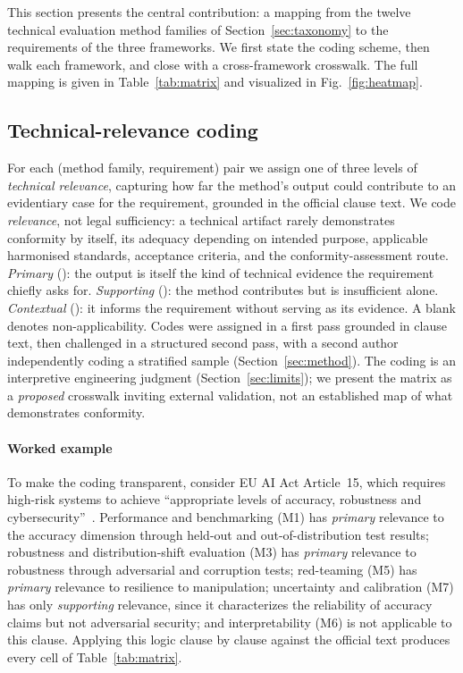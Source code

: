 This section presents the central contribution: a mapping from the twelve technical
evaluation method families of Section~\ref{sec:taxonomy} to the requirements of the three
frameworks. We first state the coding scheme, then walk each framework, and close with a
cross-framework crosswalk. The full mapping is given in Table~\ref{tab:matrix} and
visualized in Fig.~\ref{fig:heatmap}.

\subsection{Technical-relevance coding}
For each (method family, requirement) pair we assign one of three levels of \emph{technical
relevance}, capturing how far the method's output could contribute to an evidentiary case for the
requirement, grounded in the official clause text. We code \emph{relevance}, not legal
sufficiency: a technical artifact rarely demonstrates conformity by itself, its adequacy
depending on intended purpose, applicable harmonised standards, acceptance criteria, and the
conformity-assessment route. \emph{Primary} (\direct): the output is itself the kind of
technical evidence the requirement chiefly asks for. \emph{Supporting} (\partialev): the
method contributes but is insufficient alone. \emph{Contextual} (\indirect): it informs the
requirement without serving as its evidence. A blank denotes non-applicability. Codes were
assigned in a first pass grounded in clause text, then challenged in a structured second
pass, with a second author independently coding a stratified sample (Section~\ref{sec:method}).
The coding is an interpretive engineering judgment (Section~\ref{sec:limits}); we present the
matrix as a \emph{proposed} crosswalk inviting external validation, not an established map of
what demonstrates conformity.

\paragraph{Worked example} To make the coding transparent, consider EU AI Act Article~15,
which requires high-risk systems to achieve ``appropriate levels of accuracy, robustness
and cybersecurity''~\cite{euaiact2024}. Performance and benchmarking (M1) has
\emph{primary} relevance to the accuracy dimension through held-out and out-of-distribution
test results; robustness and distribution-shift evaluation (M3) has \emph{primary} relevance
to robustness through adversarial and corruption tests; red-teaming (M5) has \emph{primary}
relevance to resilience to manipulation; uncertainty and calibration (M7) has only
\emph{supporting} relevance, since it characterizes the reliability of accuracy claims but
not adversarial security; and interpretability (M6) is not applicable to this
clause. Applying this logic clause by clause against the official text produces every cell
of Table~\ref{tab:matrix}.

